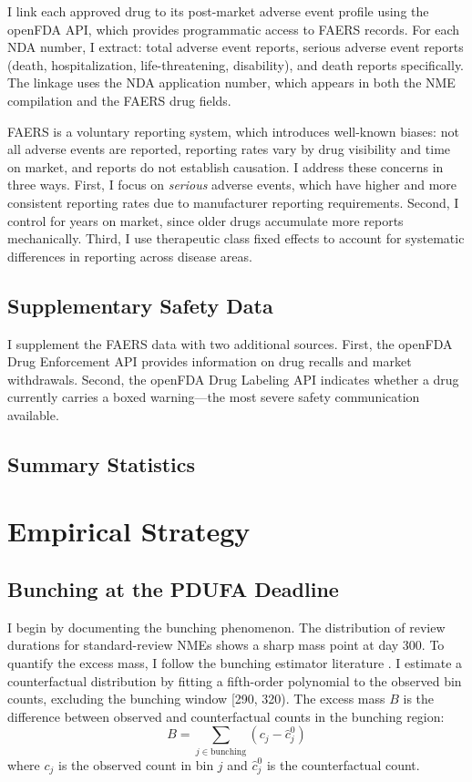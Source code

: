 \documentclass[12pt]{article}
\begin{document}
I link each approved drug to its post-market adverse event profile using the openFDA API, which provides programmatic access to FAERS records. For each NDA number, I extract: total adverse event reports, serious adverse event reports (death, hospitalization, life-threatening, disability), and death reports specifically. The linkage uses the NDA application number, which appears in both the NME compilation and the FAERS drug fields.

FAERS is a voluntary reporting system, which introduces well-known biases: not all adverse events are reported, reporting rates vary by drug visibility and time on market, and reports do not establish causation. I address these concerns in three ways. First, I focus on \textit{serious} adverse events, which have higher and more consistent reporting rates due to manufacturer reporting requirements. Second, I control for years on market, since older drugs accumulate more reports mechanically. Third, I use therapeutic class fixed effects to account for systematic differences in reporting across disease areas.

\subsection{Supplementary Safety Data}

I supplement the FAERS data with two additional sources. First, the openFDA Drug Enforcement API provides information on drug recalls and market withdrawals. Second, the openFDA Drug Labeling API indicates whether a drug currently carries a boxed warning---the most severe safety communication available.

\subsection{Summary Statistics}



\section{Empirical Strategy}

\subsection{Bunching at the PDUFA Deadline}

I begin by documenting the bunching phenomenon. The distribution of review durations for standard-review NMEs shows a sharp mass point at day 300. To quantify the excess mass, I follow the bunching estimator literature \citep{saez2010taxpayers, kleven2016bunching}. I estimate a counterfactual distribution by fitting a fifth-order polynomial to the observed bin counts, excluding the bunching window [290, 320). The excess mass $B$ is the difference between observed and counterfactual counts in the bunching region:
\begin{equation}
B = \sum_{j \in \text{bunching}} (c_j - \hat{c}_j^0)
\end{equation}
where $c_j$ is the observed count in bin $j$ and $\hat{c}_j^0$ is the counterfactual count.
\end{document}
